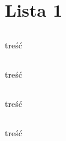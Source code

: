 \documentclass[svgnames]{article}
\begin{document}


\section{Lista 1}
\subsection{}%
\subsection{}%
\subsection{}%
\subsection{}%
\subsection{}%
\subsection{}%
\begin{framed}
treść
\end{framed}

\subsection{}%
\begin{framed}
treść
\end{framed}

\subsection{}%
\begin{framed}
treść
\end{framed}

\subsection{}%

\subsection{}%
\begin{framed}
treść
\end{framed}
\end{document}
